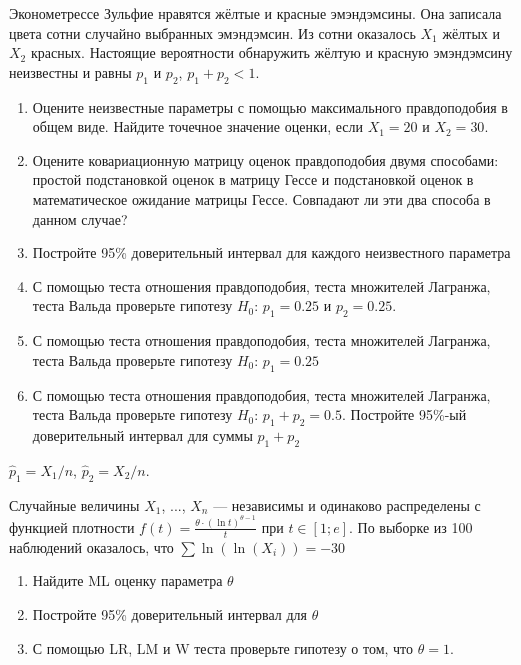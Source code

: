 \documentclass[pdftex,11pt,openany]{book}\usepackage[]{graphicx}\usepackage[]{color}
\begin{document}
\begin{problem}
\useR Эконометрессе Зульфие нравятся жёлтые и красные эмэндэмсины. Она записала цвета сотни случайно выбранных эмэндэмсин. Из сотни оказалось $X_1$ жёлтых и $X_2$ красных. Настоящие вероятности обнаружить жёлтую и красную эмэндэмсину неизвестны и равны $p_1$ и $p_2$, $p_1+p_2<1$.

\begin{enumerate}
\item Оцените неизвестные параметры с помощью максимального правдоподобия в общем виде. Найдите точечное значение оценки, если $X_1=20$ и $X_2=30$.
\item Оцените ковариационную матрицу оценок правдоподобия двумя способами: простой подстановкой оценок в матрицу Гессе и подстановкой оценок в математическое ожидание матрицы Гессе. Совпадают ли эти два способа в данном случае?
\item Постройте 95\% доверительный интервал для каждого неизвестного параметра
\item С помощью теста отношения правдоподобия, теста множителей Лагранжа, теста Вальда проверьте гипотезу $H_0$: $p_1=0.25$ и $p_2=0.25$.
\item С помощью теста отношения правдоподобия, теста множителей Лагранжа, теста Вальда проверьте гипотезу $H_0$: $p_1=0.25$ 
\item С помощью теста отношения правдоподобия, теста множителей Лагранжа, теста Вальда проверьте гипотезу $H_0$: $p_1+p_2=0.5$. Постройте 95\%-ый доверительный интервал для суммы $p_1+p_2$
\end{enumerate}

\end{problem}

\begin{solution}
$\hat{p}_1=X_1/n$, $\hat{p}_2=X_2/n$.
\end{solution}


\begin{problem}
Случайные величины $X_{1}$, ..., $X_{n}$ --- независимы и одинаково распределены с функцией плотности $f(t)=\frac{\theta \cdot\left(\ln  t\right)^{\theta -1}}{t} $  при  $t\in
\left[1;e\right]$. По выборке из 100 наблюдений оказалось, что $\sum{\ln(\ln(X_{i}))}=-30$ 
\begin{enumerate}
\item Найдите ML оценку параметра $\theta$
\item Постройте 95\% доверительный интервал для $\theta$
\item С помощью LR, LM и W теста проверьте гипотезу о том, что $\theta=1$.
\end{enumerate}
\end{problem}
\end{document}
